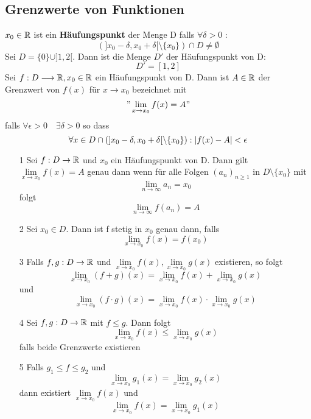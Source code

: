 \subsection{Grenzwerte von Funktionen}
\Def[3.47] \(x_0 \in \mathbb{R} \) ist ein \textbf{Häufungspunkt} der Menge D falls \( \forall \delta > 0\) : 
\[ (]x_0 - \delta, x_0 + \delta [ \setminus \{x_0\}) \cap D \neq \emptyset \]
\Bsp[3.48] Sei \( D = \{0\} \cup ]1,2[.\) Dann ist die Menge \(D'\) der Häufungspunkt von D:
\[ D' =[1,2]\]
\Def[3.49] Sei \( f: D \longrightarrow \mathbb{R}, x_0 \in \mathbb{R} \) ein Häufungspunkt von D. Dann ist \(A \in \mathbb{R} \) der Grenzwert von \(f(x)\) für \(x \rightarrow x_0\) bezeichnet mit
\["\lim\limits_{x \rightarrow x_0} f(x) = A"\]
falls \( \forall \epsilon > 0 \quad \exists \delta > 0\) so dass
\[ \forall x \in D \cap (] x_0 - \delta, x_0 + \delta [ \setminus \{x_0\}) : \left\lvert f(x) - A  \right\rvert < \epsilon\]
\begin{enumerate}
    \item [1] Sei \(f : D \rightarrow \mathbb{R} \) und \(x_0\) ein Häufungspunkt von D. Dann gilt \(\lim\limits_{x \rightarrow x_0} f(x) = A \) genau dann wenn für alle Folgen \((a_n)_{n \geq 1 }\) in \(D \setminus \{x_0\}\) mit
    \[ \lim\limits_{n \rightarrow \infty} a_n = x_0  \]
    folgt
    \[ \lim\limits_{n \rightarrow \infty} f(a_n) = A \]
    \item [2] Sei \(x_0 \in D. \) Dann ist f stetig in \(x_0\) genau dann, falls
    \[ \lim\limits_{x \rightarrow x_0} f(x) = f(x_0)\]
    \item [3] Falls \(f,g : D \rightarrow \mathbb{R} \) und \( \lim\limits_{x \rightarrow x_0} f(x), \lim\limits_{x \rightarrow x_0} g(x)\) existieren, so folgt
    \[\lim\limits_{x \rightarrow x_0}(f + g)(x) = \lim\limits_{x \rightarrow x_0} f(x) + \lim\limits_{x \rightarrow x_0} g(x)\]
    und
    \[\lim\limits_{x \rightarrow x_0}(f \cdot g)(x) = \lim\limits_{x \rightarrow x_0} f(x) \cdot \lim\limits_{x \rightarrow x_0} g(x)\]
    \item [4] Sei \(f,g : D \rightarrow \mathbb{R} \) mit \(f \leq g \). Dann folgt
    \[\lim\limits_{x \rightarrow x_0} f(x) \leq \lim\limits_{x \rightarrow x_0} g(x)\]
    falls beide Grenzwerte existieren
    \newline\newline
    \item [5] Falls \(g_1 \leq f \leq g_2\) und
    \[ \lim\limits_{x \rightarrow x_0} g_1(x) = \lim\limits_{x \rightarrow x_0} g_2(x)\]
    dann existiert \(\lim\limits_{x \rightarrow x_0} f(x)\) und
    \[ \lim\limits_{x \rightarrow x_0} f(x) = \lim\limits_{x \rightarrow x_0} g_1(x )\]
\end{enumerate}
